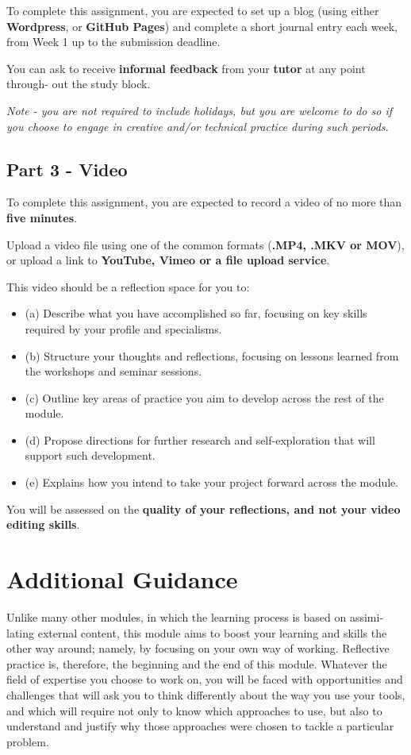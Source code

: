 \documentclass{../../fal_assignment}
\begin{document}
To complete this assignment, you are expected to set up a blog (using either \textbf{Wordpress}, or \textbf{GitHub Pages}) and complete a short journal entry each week, from Week 1 up to the submission deadline.

You can ask to receive \textbf{informal feedback} from your \textbf{tutor} at any point through- out the study block.

\emph{Note - you are not required to include holidays, but you are welcome to do so if you choose to engage in creative and/or technical practice during such periods.}

\pagebreak

\subsection*{Part 3 - Video} 

To complete this assignment, you are expected to record a video of no more than \textbf{five minutes}. 

Upload a video file using one of the common formats (\textbf{.MP4, .MKV or MOV}), or upload a link to \textbf{YouTube, Vimeo or a file upload service}.

This video should be a reflection space for you to:
\begin{itemize}
\item(a) Describe what you have accomplished so far, focusing on key skills required by your profile and specialisms.
\item(b) Structure your thoughts and reflections, focusing on lessons learned from the workshops and seminar sessions.
\item(c) Outline key areas of practice you aim to develop across the rest of the module.
\item(d) Propose directions for further research and self-exploration that will support such development.
\item(e) Explains how you intend to take your project forward across the module.
\end{itemize}
You will be assessed on the \textbf{quality of your reflections, and not your video editing skills}.

\section*{Additional Guidance}

Unlike many other modules, in which the learning process is based on assimi- lating external content, this module aims to boost your learning and skills the other way around; namely, by focusing on your own way of working. Reflective practice is, therefore, the beginning and the end of this module. Whatever the field of expertise you choose to work on, you will be faced with opportunities and challenges that will ask you to think differently about the way you use your tools, and which will require not only to know which approaches to use, but also to understand and justify why those approaches were chosen to tackle a particular problem.
\end{document}
